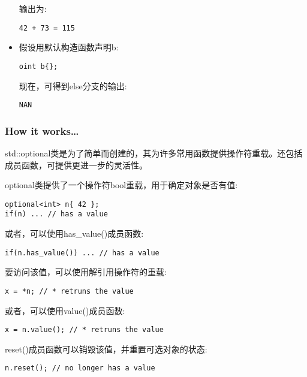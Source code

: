 \begin{itemize}
输出为:

\begin{lstlisting}[style=styleCXX]
42 + 73 = 115
\end{lstlisting}

\item 
假设用默认构造函数声明b:

\begin{lstlisting}[style=styleCXX]
oint b{};
\end{lstlisting}

现在，可得到else分支的输出:

\begin{lstlisting}[style=styleCXX]
NAN
\end{lstlisting}
\end{itemize}


\subsubsection{How it works…}

std::optional类是为了简单而创建的，其为许多常用函数提供操作符重载。还包括成员函数，可提供更进一步的灵活性。

optional类提供了一个操作符bool重载，用于确定对象是否有值:

\begin{lstlisting}[style=styleCXX]
optional<int> n{ 42 };
if(n) ... // has a value
\end{lstlisting}

或者，可以使用has\_value()成员函数:

\begin{lstlisting}[style=styleCXX]
if(n.has_value()) ... // has a value
\end{lstlisting}

要访问该值，可以使用解引用操作符的重载:

\begin{lstlisting}[style=styleCXX]
x = *n; // * retruns the value
\end{lstlisting}

或者，可以使用value()成员函数:

\begin{lstlisting}[style=styleCXX]
x = n.value(); // * retruns the value
\end{lstlisting}

reset()成员函数可以销毁该值，并重置可选对象的状态:

\begin{lstlisting}[style=styleCXX]
n.reset(); // no longer has a value
\end{lstlisting}


